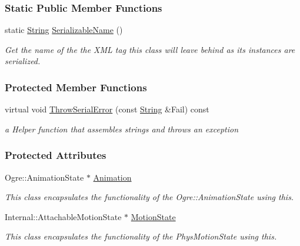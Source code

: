 \subsubsection*{Static Public Member Functions}
\begin{DoxyCompactItemize}
\item 
static \hyperlink{namespaceMezzanine_acf9fcc130e6ebf08e3d8491aebcf1c86}{String} \hyperlink{classMezzanine_1_1ActorBase_af6f41bdc0932b99f82f317d27d8dc906}{Serializable\-Name} ()
\begin{DoxyCompactList}\small\item\em Get the name of the the X\-M\-L tag this class will leave behind as its instances are serialized. \end{DoxyCompactList}\end{DoxyCompactItemize}
\subsubsection*{Protected Member Functions}
\begin{DoxyCompactItemize}
\item 
virtual void \hyperlink{classMezzanine_1_1ActorBase_a24d196b9fc55048fb183a7920b5bbd3e}{Throw\-Serial\-Error} (const \hyperlink{namespaceMezzanine_acf9fcc130e6ebf08e3d8491aebcf1c86}{String} \&Fail) const 
\begin{DoxyCompactList}\small\item\em a Helper function that assembles strings and throws an exception \end{DoxyCompactList}\end{DoxyCompactItemize}
\subsubsection*{Protected Attributes}
\begin{DoxyCompactItemize}
\item 
\hypertarget{classMezzanine_1_1ActorBase_ae71259b98aed5a9c269e0758344d36a7}{Ogre\-::\-Animation\-State $\ast$ \hyperlink{classMezzanine_1_1ActorBase_ae71259b98aed5a9c269e0758344d36a7}{Animation}}\label{classMezzanine_1_1ActorBase_ae71259b98aed5a9c269e0758344d36a7}

\begin{DoxyCompactList}\small\item\em This class encapsulates the functionality of the Ogre\-::\-Animation\-State using this. \end{DoxyCompactList}\item 
\hypertarget{classMezzanine_1_1ActorBase_a1fa8d58874d4c395d871ae9f5628c7fd}{Internal\-::\-Attachable\-Motion\-State $\ast$ \hyperlink{classMezzanine_1_1ActorBase_a1fa8d58874d4c395d871ae9f5628c7fd}{Motion\-State}}\label{classMezzanine_1_1ActorBase_a1fa8d58874d4c395d871ae9f5628c7fd}

\begin{DoxyCompactList}\small\item\em This class encapsulates the functionality of the Phys\-Motion\-State using this. \end{DoxyCompactList}\end{DoxyCompactItemize}
